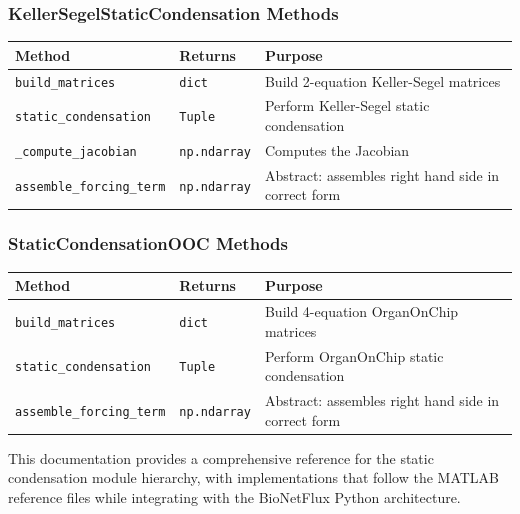 \subsubsection{KellerSegelStaticCondensation Methods}

\begin{longtable}{|p{4.7cm}|p{2cm}|p{7cm}|}
\hline
\textbf{Method} & \textbf{Returns} & \textbf{Purpose} \\
\hline
\endhead

\texttt{build\_matrices} & \texttt{dict} & Build 2-equation Keller-Segel matrices \\
\hline

\texttt{static\_condensation} & \texttt{Tuple} & Perform Keller-Segel static condensation \\
\hline

\texttt{\_compute\_jacobian} & \texttt{np.ndarray} & Computes the Jacobian \\
\hline

\texttt{assemble\_forcing\_term} & \texttt{np.ndarray} & Abstract: assembles right hand side in correct form\\
\hline
\end{longtable}

\subsubsection{StaticCondensationOOC Methods}

\begin{longtable}{|p{4cm}|p{2cm}|p{7cm}|}
\hline
\textbf{Method} & \textbf{Returns} & \textbf{Purpose} \\
\hline
\endhead

\texttt{build\_matrices} & \texttt{dict} & Build 4-equation OrganOnChip matrices  \\
\hline

\texttt{static\_condensation} & \texttt{Tuple} & Perform OrganOnChip static condensation  \\
\hline

\texttt{assemble\_forcing\_term} & \texttt{np.ndarray} & Abstract: assembles right hand side in correct form\\
\hline

\end{longtable}

This documentation provides a comprehensive reference for the static condensation module hierarchy, with implementations that follow the MATLAB reference files while integrating with the BioNetFlux Python architecture.

